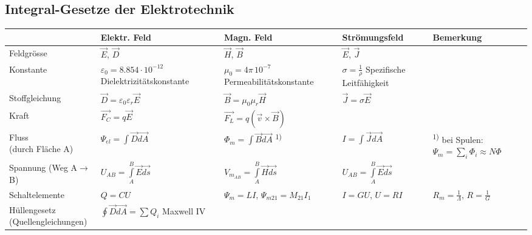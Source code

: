 \subsection{Integral-Gesetze der Elektrotechnik}
	\renewcommand{\arraystretch}{2}
	\begin{tabular}{|p{2.5cm}||p{2.7cm}|p{4cm}|p{2.7cm}|p{5cm}|}
	\hline
	& \textbf{Elektr. Feld} & \textbf{Magn. Feld} & \textbf{Strömungsfeld} & \textbf{Bemerkung}\\
	\hline \hline
	Feldgrösse & $\vec{E}$, $\vec{D}$ & $\vec{H}$, $\vec{B}$
	& $\vec{E}$, $\vec{J}$ &\\
	\hline
	Konstante
		& \parbox{2.7cm}{$\varepsilon_0 = 8.854 \cdot 10^{-12}$\\
		{\tiny Dielektrizitätskonstante} \vspace{.1cm}} 
		& \parbox{4cm}{$\mu_0 = 4 \pi \, 10^{-7}$\\ {\tiny Permeabilitätskonstante} \vspace{.1cm}} 
		& \parbox{2.7cm}{$\sigma=\frac{1}{\rho}$ \\ {\tiny Spezifische
		Leitfähigkeit}\vspace{.1cm}} &\\ 
	\hline
	Stoffgleichung & $\vec{D}=\varepsilon_0\varepsilon_r\vec{E}$ & $\vec{B}=\mu_0\mu_r\vec{H}$
	& $\vec{J}=\sigma\vec{E}$ &
	\\
	\hline
	Kraft & $\vec{F_C}=q\vec{E}$ & $\vec{F_L}=q(\vec{v}\times\vec{B})$ &&\\
	\hline
	\parbox{2.5cm}{Fluss\\{\tiny (durch Fläche A)}} & $\Psi_{el}=\int\vec{D}\vec{dA}$ &
	$\Phi_m=\int\vec{B}\vec{dA}$ \textsuperscript{1)}&
	$I=\int\vec{J}\vec{dA}$ & \textsuperscript{1)} bei Spulen:
	$\Psi_m=\sum_i\Phi_i\approx N \Phi$\\
	\hline
	\parbox{2.5cm}{Spannung \\{\tiny (Weg A$\to$B)}} & $U_{AB}=\int\limits_{A}^B
	\vec{E}\vec{ds}$ & $V_{m_{AB}}=\int\limits_{A}^B\vec{H}\vec{ds}$ 
	& $U_{AB}=\int\limits_{A}^B\vec{E}\vec{ds}$ & \\
	\hline
	Schaltelemente & $Q=CU$ & $\Psi_m=LI$, $\Psi_{m21}=M_{21}I_1$
	& $I=GU$, $U=RI$ & $R_m=\frac{1}{\Lambda}$, $R=\frac{1}{G}$\\
	\hline
	\parbox{2.5cm}{Hüllengesetz \\ {\tiny (Quellengleichungen)}}
		& \parbox{2.7cm}{
			\vspace{.1cm}$\oint\vec{D}\vec{dA}=\sum Q_i$ \vspace{.1cm}
			Maxwell IV
			\vspace{.1cm}}

\end{tabular}

